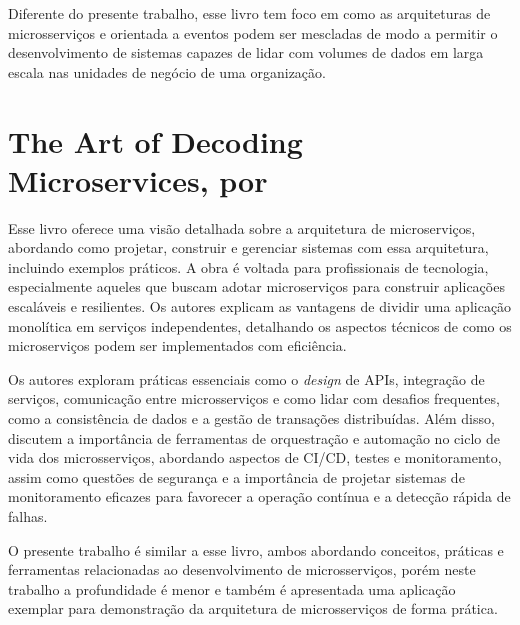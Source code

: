 Diferente do presente trabalho, esse livro tem foco em como as arquiteturas de microsserviços e orientada a eventos podem ser mescladas de modo a permitir o desenvolvimento de sistemas capazes de lidar com volumes de dados em larga escala nas unidades de negócio de uma organização.


\section{The Art of Decoding Microservices, por \texorpdfstring{}{Bhatnagar (2025)}}
Esse livro oferece uma visão detalhada sobre a arquitetura de microserviços, abordando como projetar, construir e gerenciar sistemas com essa arquitetura, incluindo exemplos práticos. A obra é voltada para profissionais de tecnologia, especialmente aqueles que buscam adotar microserviços para construir aplicações escaláveis e resilientes. Os autores explicam as vantagens de dividir uma aplicação monolítica em serviços independentes, detalhando os aspectos técnicos de como os microserviços podem ser implementados com eficiência.

Os autores exploram práticas essenciais como o \emph{design} de APIs, integração de serviços, comunicação entre microsserviços e como lidar com desafios frequentes, como a consistência de dados e a gestão de transações distribuídas. Além disso, discutem a importância de ferramentas de orquestração e automação no ciclo de vida dos microsserviços, abordando aspectos de CI/CD, testes e monitoramento, assim como questões de segurança e a importância de projetar sistemas de monitoramento eficazes para favorecer a operação contínua e a detecção rápida de falhas. 

O presente trabalho é similar a esse livro, ambos abordando conceitos, práticas e ferramentas relacionadas ao desenvolvimento de microsserviços, porém neste trabalho a profundidade é menor e também é apresentada uma aplicação exemplar para demonstração da arquitetura de microsserviços de forma prática.


